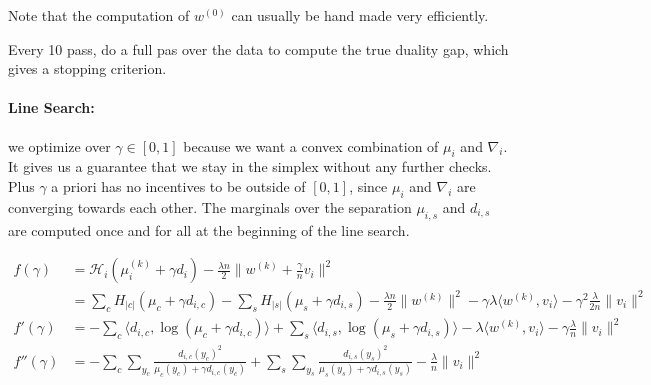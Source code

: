 \documentclass{article}
\begin{document}
Note that the computation of $w^{(0)}$ can usually be hand made very efficiently.

Every 10 pass, do a full pas over the data to compute the true duality gap, which gives a stopping criterion.

\paragraph{Line Search:} we optimize over $\gamma \in [0,1]$ because we want a convex combination of $\mu_i$ and $\nabla_i$. It gives us a guarantee that we stay in the simplex without any further checks. Plus $\gamma$ a priori has no incentives to be outside of $[0,1]$, since $\mu_i$ and $\nabla_i$ are converging towards each other. The marginals over the separation $\mu_{i, s}$ and $d_{i, s}$ are computed once and for all at the beginning of the line search.

\begin{align*}
	f(\gamma)
	& = \mathcal H_i(\mu_i^{(k)} + \gamma d_i) 
	- \frac{\lambda n}{2} \| w^{(k)} + \frac{\gamma}{n} v_i \|^2 
	\\
	& =  \sum_c H_{|c|}(\mu_c + \gamma d_{i, c}) 
	- \sum_s H_{|s|}(\mu_s + \gamma d_{i, s}) 
	- \frac{\lambda n}{2} \| w^{(k)}\|^2 
	- \gamma \lambda  \langle w^{(k)} , v_i \rangle 
	- \gamma^2 \frac{\lambda}{2n} \|v_i \|^2 
	\\
	f'(\gamma) & =  - \sum_c \langle d_{i, c}, \log(\mu_c + \gamma d_{i, c}) \rangle 
	+ \sum_s \langle d_{i, s} , \log(\mu_s + \gamma d_{i, s}) \rangle 
	- \lambda  \langle w^{(k)} , v_i \rangle 
	- \gamma \frac{\lambda}{n} \|v_i \|^2 
	\\
	f''(\gamma) & = - \sum_c \sum_{y_c} \frac{d_{i, c}(y_c)^2 }{ \mu_c(y_c) + \gamma d_{i, c}(y_c) }
	+ \sum_s \sum_{y_s} \frac{d_{i, s}(y_s)^2 }{ \mu_s(y_s) + \gamma d_{i, s}(y_s) }
	- \frac{\lambda}{n} \|v_i \|^2 
\end{align*}




\end{document}
